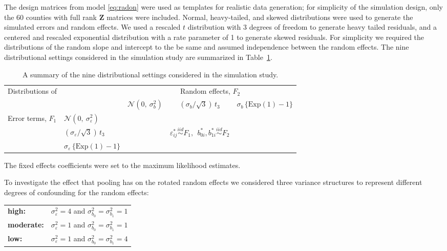 \documentclass[12pt]{article} %
\begin{document}
The design matrices from model \eqref{eq:radon} were used as templates for realistic data generation;  for simplicity of the simulation design, only the 60 counties with full rank $\bm{Z}$ matrices were included. 
Normal, heavy-tailed, and skewed distributions were used to generate the simulated errors and random effects. We used a rescaled $t$ distribution with 3 degrees of freedom to generate heavy tailed residuals, and a centered and rescaled exponential distribution with a rate parameter of 1 to generate skewed residuals. For simplicity we required the distributions of the random slope and intercept to the be same and assumed independence between the random effects. The nine distributional settings considered in the simulation study are summarized in Table~\ref{tab:simdsns}.
%
\begin{table}[htdp]
\centering
\caption{\label{tab:simdsns} A summary of the nine distributional settings considered in the simulation study.}
\begin{tabular}{llccc}\hline
Distributions of & & \multicolumn{3}{c}{Random effects, $F_2$} \\ \cline{3-5}
           & & $\mathcal{N}(0, \ \sigma^2_{b})$ & $(\sigma_{b} / \sqrt{3})\, t_3$ & $\sigma_{b} \, \{ \text{Exp}(1) - 1 \}$ \\ \hline
Error terms, $F_1$  & $\mathcal{N}(0, \ \sigma^2_{\varepsilon})$       & &&\\
             & $(\sigma_{\varepsilon} / \sqrt{3})\, t_3$  &  & $\varepsilon_{ij}^* \overset{iid}{\sim} F_1, \ \ b_{0i}^*, b_{1i}^* \overset{iid}{\sim} F_2$ &  \\
             & $\sigma_{\varepsilon} \, \{ \text{Exp}(1) - 1 \}$       & && \\ 
\hline
\end{tabular} 
\end{table}
%
The fixed effects coefficients were set to the maximum likelihood estimates.

To investigate the effect that pooling has on the rotated random effects we considered  three variance structures to represent different degrees of confounding for the random effects:\\
%
\begin{tabular}{ll}
\textbf{high:} & $\sigma^2_\varepsilon = 4$ and  $\sigma^2_{b_0} = \sigma^2_{b_1} = 1$ \\
\textbf{moderate:} & $\sigma^2_\varepsilon = 1$ and  $\sigma^2_{b_0} = \sigma^2_{b_1} = 1$ \\
\textbf{low:} & $\sigma^2_\varepsilon = 1$ and  $\sigma^2_{b_0} = \sigma^2_{b_1} = 4$ \\
\end{tabular}
%
\end{document}
